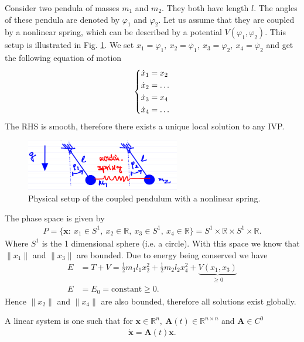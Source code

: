 \begin{ex}
	Consider two pendula of masses $m_1$ and $m_2$. They both have length $l$. The angles of these pendula are denoted by $\varphi_1$ and $\varphi_2$. Let us assume that they are coupled by a nonlinear spring, which can be described by a potential $V(\varphi_1, \varphi_2)$. This setup is illustrated in Fig. \ref{fig:coupled_pendulum}. We set $x_1 = \varphi_1,\ x_2 = \dot{\varphi_1},\ x_3 = \varphi_2,\ x_4=\dot{\varphi_2} $ and get the following equation of motion
\begin{align}
	\begin{dcases}
		\dot{x}_1 = x_2 \\ \dot{x}_2 = \ldots \\ \dot{x}_3 = x_4 \\ \dot{x}_4 = \ldots
	\end{dcases}
\end{align}
The RHS is smooth, therefore there exists a unique local solution to any IVP.
\begin{figure}[h!]
	\centering
	\includegraphics[width=0.6\textwidth]{figures/ch1/6coupled_pendulum.png}
	\caption{Physical setup of the coupled pendulum with a nonlinear spring.}
	\label{fig:coupled_pendulum}
\end{figure}
The phase space is given by 
\begin{align}
	P = \{ \textbf{x}:\ x_1 \in S^1,\ x_2 \in \mathbb{R},\ x_3 \in S^1,\ x_4 \in \mathbb{R} \} = S^1 \times \mathbb{R}\times S^1 \times \mathbb{R}.
\end{align}
Where $S^1$ is the 1 dimensional sphere (i.e. a circle). With this space we know that $ \|x_1 \|$ and $ \|x_3 \|$ are bounded. Due to energy being conserved we have
\begin{align}
	E &= T+V = \frac{1}{2}m_1 l_1 x_2^2 + \frac{1}{2}m_2 l_2 x_4^2 + \underbrace{V(x_1, x_3)}_{\geq 0}\\
	E &= E_0 =  \textrm{constant} \geq 0.
\end{align}
Hence $ \|x_2 \|$ and $ \|x_4 \|$ are also bounded, therefore all solutions exist globally.
\end{ex}
\begin{definition}
	A linear system is one such that for $ \textbf{x}\in \mathbb{R}^{n},\ \bm{A}(t) \in \mathbb{R}^{n\times n}$ and $\bm{A}\in C^0$ 
	\begin{align}
		\boxed{\dot{ \textbf{x}} = \bm{A}(t)  \textbf{x}.}
	\end{align}
\end{definition}


